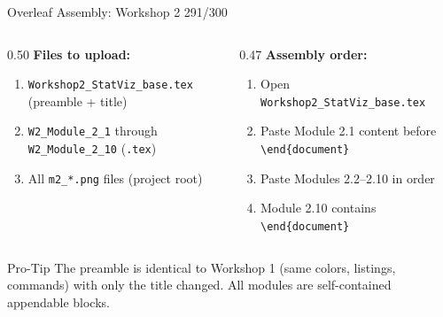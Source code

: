 \documentclass[10pt]{beamer}
\newcommand{\smark}[1]{\hfill{\scriptsize\color{codegray}#1}}
\begin{document}
\begin{frame}{Overleaf Assembly: Workshop 2}
\smark{291/300}
\begin{columns}[T]
\begin{column}{0.50\textwidth}
    \textbf{Files to upload:}
    \begin{enumerate}
        \item \texttt{Workshop2\_StatViz\_base.tex} (preamble + title)
        \item \texttt{W2\_Module\_2\_1} through \texttt{W2\_Module\_2\_10} (\texttt{.tex})
        \item All \texttt{m2\_*.png} files (project root)
    \end{enumerate}
\end{column}
\begin{column}{0.47\textwidth}
    \textbf{Assembly order:}
    \begin{enumerate}
        \item Open \texttt{Workshop2\_StatViz\_base.tex}
        \item Paste Module 2.1 content before \texttt{\textbackslash end\{document\}}
        \item Paste Modules 2.2--2.10 in order
        \item Module 2.10 contains \texttt{\textbackslash end\{document\}}
    \end{enumerate}
\end{column}
\end{columns}

\vspace{0.3cm}
\begin{alertblock}{Pro-Tip}
    \scriptsize The preamble is identical to Workshop 1 (same colors, listings, commands) with only the title changed. All modules are self-contained appendable blocks.
\end{alertblock}
\end{frame}
\end{document}
